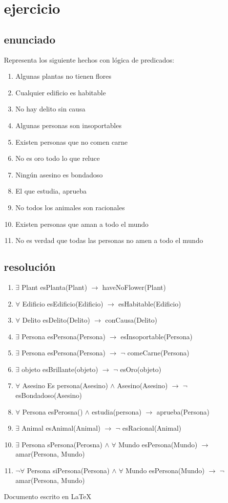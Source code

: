 \documentclass[a4paper,10pt]{article}
\begin{document}
\section{ejercicio}
\subsection{enunciado}
Representa los siguiente hechos con lógica de predicados:
\begin{enumerate}
	\item Algunas plantas no tienen flores
	\item Cualquier edificio es habitable
	\item No hay delito sin causa
	\item Algunas personas son insoportables
	\item Existen personas que no comen carne
	\item No es oro todo lo que reluce
	\item Ningún asesino es bondadoso
	\item El que estudia, aprueba
	\item No todos los animales son racionales
	\item Existen personas que aman a todo el mundo
	\item No es verdad que todas las personas no amen a todo el mundo
\end{enumerate}
\subsection{resolución}
\begin{enumerate}
	\item $\exists$ Plant esPlanta(Plant) $\rightarrow$ haveNoFlower(Plant)
	\item $\forall$ Edificio esEdificio(Edificio) $\rightarrow$ esHabitable(Edificio)
	\item $\forall$ Delito esDelito(Delito) $\rightarrow$ conCausa(Delito)
	\item $\exists$ Persona esPersona(Persona) $\rightarrow$ esInsoportable(Persona)
	\item $\exists$ Persona esPersona(Persona) $\rightarrow$ $\neg$ comeCarne(Persona)
	\item $\exists$ objeto esBrillante(objeto) $\rightarrow$ $\neg$ esOro(objeto)
	\item $\forall$ Asesino Es persona(Asesino) $\land$ Asesino(Asesino) $\rightarrow$ $\neg$ esBondadoso(Asesino)
	\item $\forall$ Persona esPerosna() $\land$ estudia(persona) $\rightarrow$ aprueba(Persona)
	\item $\exists$ Animal esAnimal(Animal) $\rightarrow$ $\neg$ esRacional(Animal)
	\item $\exists$ Persona sPersona(Perosna) $\land$ $\forall$ Mundo esPersona(Mundo) $\rightarrow$ amar(Persona, Mundo)
	\item $\neg$$\forall$ Persona siPersona(Persona) $\land$ $\forall$ Mundo esPersona(Mundo) $\rightarrow$ $\neg$ amar(Persona, Mundo)
\end{enumerate}


\vspace*{\fill}
\raggedleft Documento escrito en \LaTeX{}
\end{document}

